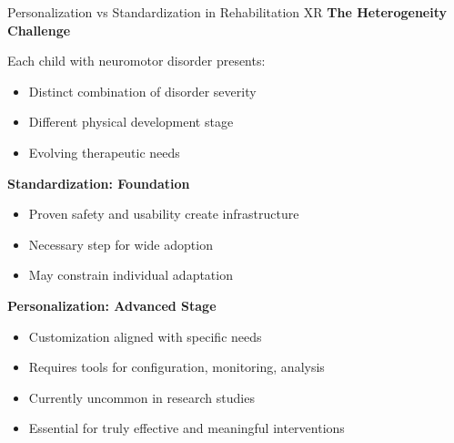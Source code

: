 \begin{frame}{Personalization vs Standardization in Rehabilitation XR}
	\textbf{\textcolor{gbAqua}{The Heterogeneity Challenge}}
	
	Each child with neuromotor disorder presents:
	\begin{itemize}
		\item Distinct combination of disorder severity
		\item Different physical development stage
		\item Evolving therapeutic needs
	\end{itemize}
	
	\vspace{0.3cm}
	
	\textbf{\textcolor{gbAqua}{Standardization: Foundation}}
	
	\begin{itemize}
		\item Proven safety and usability create infrastructure
		\item Necessary step for wide adoption
		\item May constrain individual adaptation
	\end{itemize}
	
	\vspace{0.3cm}
	
	\textbf{\textcolor{gbAqua}{Personalization: Advanced Stage}}
	
	\begin{itemize}
		\item Customization aligned with specific needs
		\item Requires tools for configuration, monitoring, analysis
		\item Currently uncommon in research studies
		\item Essential for truly effective and meaningful interventions
	\end{itemize}
	
\end{frame}

